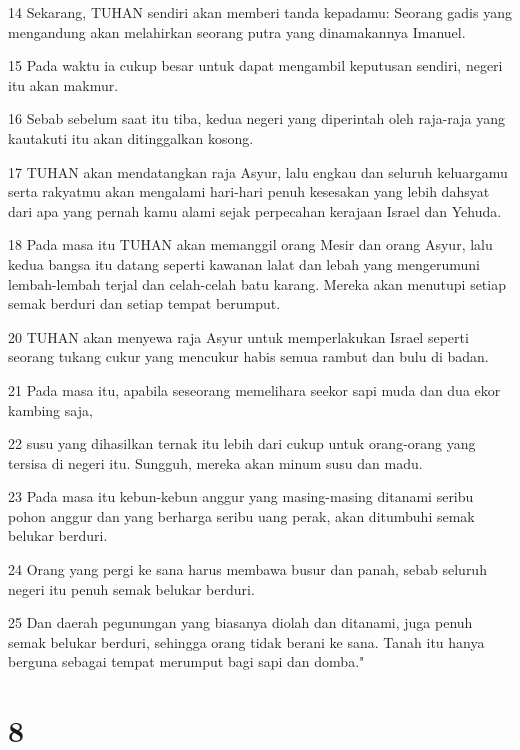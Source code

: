 \par 14 Sekarang, TUHAN sendiri akan memberi tanda kepadamu: Seorang gadis yang mengandung akan melahirkan seorang putra yang dinamakannya Imanuel.
\par 15 Pada waktu ia cukup besar untuk dapat mengambil keputusan sendiri, negeri itu akan makmur.
\par 16 Sebab sebelum saat itu tiba, kedua negeri yang diperintah oleh raja-raja yang kautakuti itu akan ditinggalkan kosong.
\par 17 TUHAN akan mendatangkan raja Asyur, lalu engkau dan seluruh keluargamu serta rakyatmu akan mengalami hari-hari penuh kesesakan yang lebih dahsyat dari apa yang pernah kamu alami sejak perpecahan kerajaan Israel dan Yehuda.
\par 18 Pada masa itu TUHAN akan memanggil orang Mesir dan orang Asyur, lalu kedua bangsa itu datang seperti kawanan lalat dan lebah yang mengerumuni lembah-lembah terjal dan celah-celah batu karang. Mereka akan menutupi setiap semak berduri dan setiap tempat berumput.
\par 20 TUHAN akan menyewa raja Asyur untuk memperlakukan Israel seperti seorang tukang cukur yang mencukur habis semua rambut dan bulu di badan.
\par 21 Pada masa itu, apabila seseorang memelihara seekor sapi muda dan dua ekor kambing saja,
\par 22 susu yang dihasilkan ternak itu lebih dari cukup untuk orang-orang yang tersisa di negeri itu. Sungguh, mereka akan minum susu dan madu.
\par 23 Pada masa itu kebun-kebun anggur yang masing-masing ditanami seribu pohon anggur dan yang berharga seribu uang perak, akan ditumbuhi semak belukar berduri.
\par 24 Orang yang pergi ke sana harus membawa busur dan panah, sebab seluruh negeri itu penuh semak belukar berduri.
\par 25 Dan daerah pegunungan yang biasanya diolah dan ditanami, juga penuh semak belukar berduri, sehingga orang tidak berani ke sana. Tanah itu hanya berguna sebagai tempat merumput bagi sapi dan domba."

\chapter{8}

